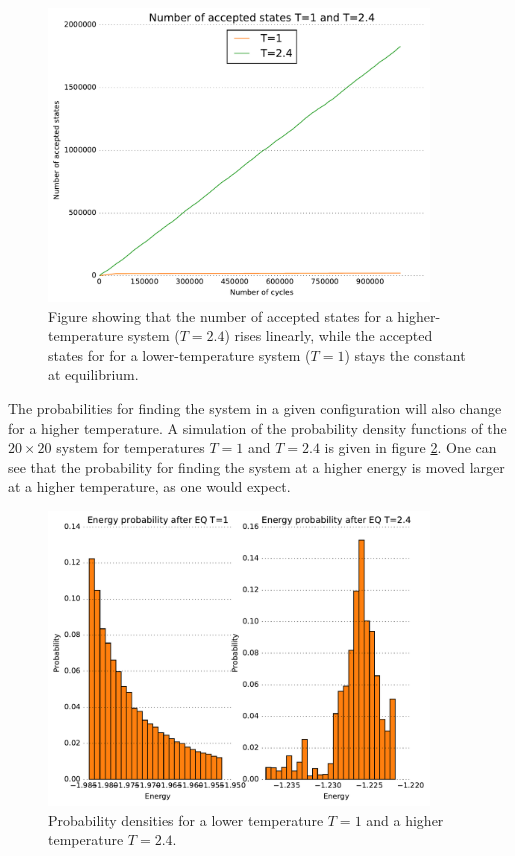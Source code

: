 \documentclass[10pt,a4paper]{amsart}
\begin{document}
\begin{figure}
	\centering
	\includegraphics[width=0.9\textwidth]{../figures/20NaccofNT1and24.pdf}
	\caption{Figure showing that the number of accepted states for a higher-temperature system ($T=2.4$) rises linearly, while the accepted states for for a lower-temperature system ($T=1$) stays the constant at equilibrium.\label{fig:acceptedstates}}
\end{figure}

The probabilities for finding the system in a given configuration will also change for a higher temperature. A simulation of the probability density functions of the $20\times20$ system for temperatures $T=1$ and $T=2.4$ is given in figure \ref{fig:pde}. One can see that the probability for finding the system at a higher energy is moved larger at a higher temperature, as one would expect.

\begin{figure}
	\centering
	\includegraphics[width=0.9\textwidth]{../figures/EhistProbBothT.pdf}
	\caption{Probability densities for a lower temperature $T=1$ and a higher temperature $T=2.4$. \label{fig:pde}}
\end{figure}
\end{document}
